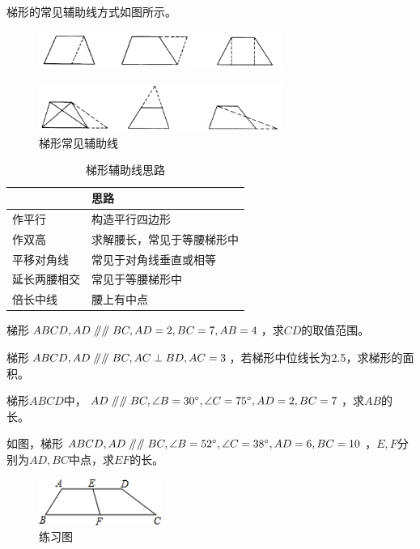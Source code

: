 \documentclass{ecnuthesis}
\newcommand\px{\mathrel{/\mkern-5mu/}}  %
\begin{document}
\begin{model}
    梯形的常见辅助线方式如图所示。
\end{model}
\begin{figure}[H]
\centering
\includegraphics[width=8cm]{picture/673.png}
\end{figure}
\begin{figure}[H]
\centering
\includegraphics[width=8cm]{picture/674.png}
\caption{梯形常见辅助线}
\end{figure}
\begin{table}[H]
\centering
\caption{梯形辅助线思路}
\begin{tabular}{|l|l|}
\hline
    & 思路 \\
\hline
作平行 & 构造平行四边形 \\
\hline
作双高 & 求解腰长，常见于等腰梯形中 \\
\hline
平移对角线 & 常见于对角线垂直或相等 \\
\hline
延长两腰相交 & 常见于等腰梯形中 \\
\hline
倍长中线 & 腰上有中点 \\
\hline
\end{tabular}
\end{table}
\begin{problem}
    梯形$ABCD,AD\px \px BC,AD=2,BC=7,AB=4$，求$CD$的取值范围。
\end{problem}
\begin{problem}
    梯形$ABCD,AD\px \px BC,AC\perp BD,AC=3$，若梯形中位线长为2.5，求梯形的面积。
\end{problem}
\begin{problem}
    梯形$ABCD$中，$AD\px \px BC,\angle B=30^\circ,\angle C=75^\circ,AD=2,BC=7$，求$AB$的长。
\end{problem}
\begin{problem}
    如图，梯形$ABCD,AD\px \px BC,\angle B=52^\circ,\angle C=38^\circ,AD=6,BC=10$，$E,F$分别为$AD,BC$中点，求$EF$的长。
\end{problem}
\begin{figure}[H]
\centering
\includegraphics[width=4cm]{picture/628.png}
\caption{练习图}
\end{figure}
\end{document}
